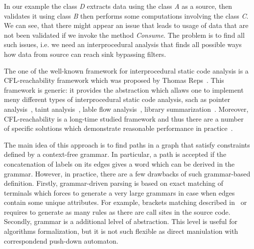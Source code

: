 In our example the class \textit{D} extracts data using the class \textit{A} as a source, then validates it using class \textit{B} then performs some computations involving the class \textit{C}.
We can see, that there might appear an issue that leads to usage of data that are not been validated if we invoke the method \textit{Consume}.
The problem is to find all such issues, i.e. we need an interprocedural analysis that finds all possible ways how data from source can reach sink bypassing filters.

The one of the well-known framework for interprocedural static code analysis is a CFL-reachability framework which was proposed by Thomas Reps~\cite{Reps}.
This framework is generic: it provides the abstraction which allaws one to implement meny different types of interprocedural static code analysis, sach as pointer analysis~\cite{Zheng, JavaCFL}, taint analysis~\cite{Huang:2015:SPT:2771783.2771803}, lable flow analysis~\cite{10.1007/11823230_7,CFLr}, library summarization~\cite{10.1007/978-3-662-54434-1_33}.
Moreover, CFL-reachability is a long-time studied framework and thus there are a number of specific solutions which demonstrate reasonable performance in practice~\cite{Wang:2017:GSD:3093315.3037744}.

The main idea of this approach is to find paths in a graph that satisfy constraints defined by a context-free grammar.
In particular, a path is accepted if the concatenation of labels on its edges gives a word which can be derived in the grammar.
However, in practice, there are a few drawbacks of such grammar-based definition.
Firstly, grammar-driven parsing is based on exact matching of terminals which forces to generate a very large grammars in case when edges contain some unique attributes.
For example, brackets matching described in~\cite{CFLr} or~\cite{Zheng, JavaCFL} requires to generate as many rules as there are call sites in the source code.
Secondly, grammar is a additional lelvel of abstraction.
This level is useful for algorithms formalization, but it is not such flexible as direct maniulation with correspondend push-down automaton.

